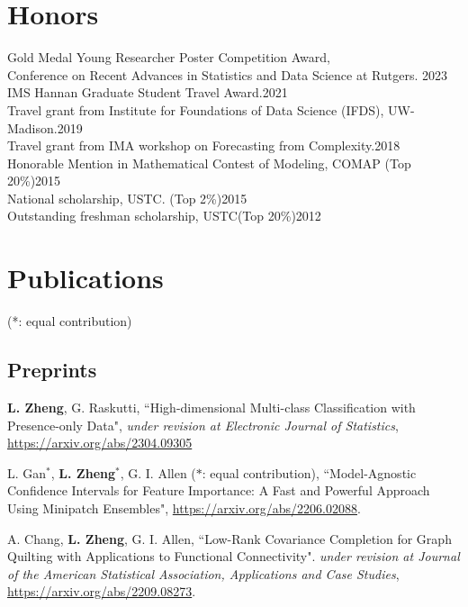 \documentclass[letterpaper,11pt]{article}
\begin{document}
		\section{Honors}
	{ Gold Medal Young Researcher Poster Competition Award, \\Conference on Recent Advances in Statistics and Data Science at Rutgers. \hfill 2023\\
		
		IMS Hannan Graduate Student Travel Award.\hfill 2021\\
		Travel grant from Institute for Foundations of Data Science (IFDS), UW-Madison.\hfill                       2019\\
		Travel grant from IMA workshop on Forecasting from Complexity.\hfill                              2018\\
		Honorable Mention in Mathematical Contest of Modeling, COMAP (Top 20\%)\hfill        2015\\
		National scholarship, USTC. (Top 2\%)\hfill                                       2015\\
		Outstanding freshman scholarship, USTC(Top 20\%)\hfill                                   2012\\}
	
	\section{Publications}
	(*: equal contribution)
	\subsection*{Preprints}
	\begin{etaremune}[start=13]
		\item {\bf L. Zheng}, G. Raskutti, ``High-dimensional Multi-class Classification with Presence-only Data", {\em under revision at Electronic Journal of Statistics},  \href{https://arxiv.org/abs/2304.09305}{https://arxiv.org/abs/2304.09305}
		\item L. Gan$^{*}$, {\bf L. Zheng}$^{*}$, G. I. Allen ($*$: equal contribution), ``Model-Agnostic Confidence Intervals for Feature Importance: A Fast and Powerful Approach Using Minipatch Ensembles", \href{https://arxiv.org/abs/2206.02088}{https://arxiv.org/abs/2206.02088}.
		\item A. Chang, {\bf L. Zheng}, G. I. Allen, ``Low-Rank Covariance Completion for Graph Quilting with Applications to Functional Connectivity". {\em under revision at Journal of the American Statistical Association, Applications and Case Studies}, \href{https://arxiv.org/abs/2209.08273}{https://arxiv.org/abs/2209.08273}.
	\end{etaremune}
\end{document}
